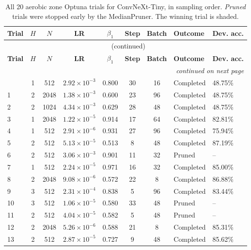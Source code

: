 {\footnotesize
\begin{longtable}{lccccccll}
\caption{All 20 aerobic zone Optuna trials for ConvNeXt-Tiny, in sampling order. \emph{Pruned} trials were stopped early by the MedianPruner. The winning trial is shaded.}
\label{tab:trials_aerobic_convnext_tiny} \\
\toprule
\textbf{Trial} & \textbf{$H$} & \textbf{$N$} & \textbf{LR} & \textbf{$\beta_1$} & \textbf{Step} & \textbf{Batch} & \textbf{Outcome} & \textbf{Dev. acc.} \\
\midrule
\endfirsthead
\multicolumn{9}{c}{\tablename\ \thetable{} (continued)} \\
\toprule
\textbf{Trial} & \textbf{$H$} & \textbf{$N$} & \textbf{LR} & \textbf{$\beta_1$} & \textbf{Step} & \textbf{Batch} & \textbf{Outcome} & \textbf{Dev. acc.} \\
\midrule
\endhead
\midrule
\multicolumn{9}{r}{\emph{continued on next page}} \\
\endfoot
\bottomrule
\endlastfoot
0 & 1 & 512 & $2.92\times10^{-3}$ & 0.800 & 30 & 16 & Completed & 48.75\% \\
1 & 2 & 2048 & $1.38\times10^{-3}$ & 0.600 & 23 & 96 & Completed & 48.75\% \\
2 & 2 & 1024 & $4.34\times10^{-3}$ & 0.629 & 28 & 48 & Completed & 48.75\% \\
3 & 1 & 2048 & $1.22\times10^{-5}$ & 0.914 & 17 & 64 & Completed & 82.81\% \\
4 & 1 & 512 & $2.91\times10^{-6}$ & 0.931 & 27 & 96 & Completed & 75.94\% \\
5 & 2 & 512 & $5.13\times10^{-5}$ & 0.513 & 8 & 48 & Completed & 87.19\% \\
6 & 2 & 512 & $3.06\times10^{-3}$ & 0.901 & 11 & 32 & Pruned & -- \\
7 & 1 & 512 & $2.24\times10^{-5}$ & 0.971 & 16 & 32 & Completed & 85.00\% \\
8 & 2 & 2048 & $9.08\times10^{-6}$ & 0.572 & 22 & 8 & Completed & 86.88\% \\
9 & 3 & 512 & $2.31\times10^{-4}$ & 0.838 & 5 & 96 & Completed & 83.44\% \\
10 & 3 & 512 & $1.06\times10^{-5}$ & 0.580 & 33 & 48 & Pruned & -- \\
11 & 2 & 512 & $4.04\times10^{-5}$ & 0.582 & 5 & 48 & Pruned & -- \\
12 & 2 & 2048 & $5.26\times10^{-6}$ & 0.588 & 21 & 8 & Completed & 85.31\% \\
13 & 2 & 512 & $2.87\times10^{-5}$ & 0.727 & 9 & 48 & Completed & 85.62\% \\

\end{longtable}}
